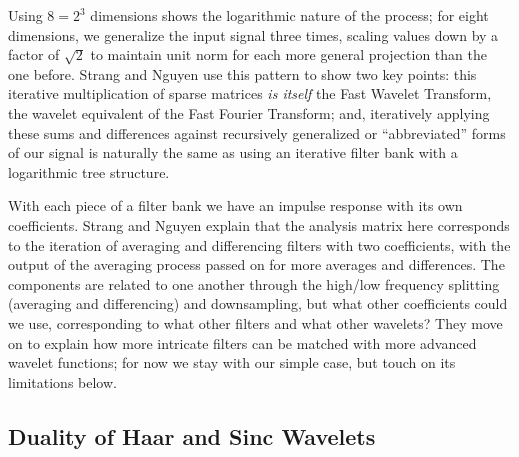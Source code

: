 \documentclass[letterpaper]{article}
\begin{document}
Using \( 8 = 2^3 \) dimensions shows the logarithmic nature of the process; for eight dimensions, we generalize the input signal three times,
scaling values down by a factor of \( \sqrt{2} \) to maintain unit norm for each more general projection than the one before.
Strang and Nguyen use this pattern to show two key points:
this iterative multiplication of sparse matrices \emph{is itself} the Fast Wavelet Transform, the wavelet equivalent of the Fast Fourier Transform;
and, iteratively applying these sums and differences against recursively generalized or ``abbreviated'' forms of our signal
is naturally the same as using an iterative filter bank with a logarithmic tree structure.

With each piece of a filter bank we have an impulse response with its own coefficients.
Strang and Nguyen explain that the analysis matrix here corresponds to the iteration of averaging and differencing filters
with two coefficients, with the output of the averaging process passed on for more averages and differences.
The components are related to one another through the high/low frequency splitting (averaging and differencing) and downsampling,
but what other coefficients could we use, corresponding to what other filters and what other wavelets?
They move on to explain how more intricate filters can be matched with more advanced wavelet functions;
for now we stay with our simple case, but touch on its limitations below.

\subsection{Duality of Haar and Sinc Wavelets}
\end{document}
